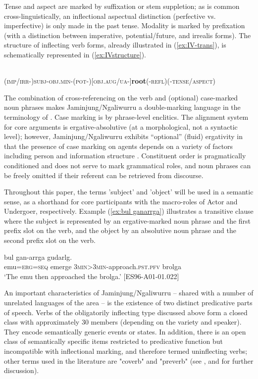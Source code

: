 \documentclass[output=paper,colorlinks,citecolor=brown]{langscibook}
\begin{document}
Tense and aspect are marked by suffixation or stem suppletion; as is common cross-linguistically, an inflectional aspectual distinction (perfective vs. imperfective) is only made in the past tense. Modality is marked by prefixation (with a distinction between imperative, potential/future, and irrealis forms). The structure of inflecting verb forms, already illustrated in (\ref{ex:IV-trans}), is schematically represented in (\ref{ex:IVstructure}). 

\\
\textsc{(imp/irr-)subj-obj.min-(pot-)[obj.aug/ua-]}\textbf{root}\textsc{(-refl)(-tense/aspect)}\\
\label{ex:IVstructure}
\z

The combination of cross-referencing on the verb and (optional) case-marked noun phrases makes Jaminjung/Ngaliwurru a double-marking language in the terminology of \citet{Nichols1986}. Case marking is by phrase-level enclitics. The alignment system for core arguments is ergative-absolutive (at a morphological, not a syntactic level); however, Jaminjung/Ngaliwurru exhibits “optional” (fluid) ergativity in that the presence of case marking on agents depends on a variety of factors including person and information structure \citep{SchultzeBerndt2017,SchultzeBerndtMeakinsinprep}.
Constituent order is pragmatically conditioned and does not serve to mark grammatical roles, and noun phrases can be freely omitted if their referent can be retrieved from discourse.

Throughout this paper, the terms 'subject' and 'object' will be used in a semantic sense, as a shorthand for core participants with the macro-roles of Actor and Undergoer, respectively. Example (\ref{ex:bul ganarrga}) illustrates a transitive clause where the subject is represented by an ergative-marked noun phrase and the first prefix slot on the verb, and the object by an absolutive noun phrase and the second prefix slot on the verb. 

\ea 
{} {bul} {gan-arrga} {gudarlg.}\\
emu\textsc{=erg=seq} emerge \textsc{3min>3min}-approach.\textsc{pst.pfv} brolga\\ 
\glt `The emu then approached the brolga.' [ES96-A01-01.022]
\label{ex:bul ganarrga}
\z

An important characteristics of Jaminjung/Ngaliwurru – shared with a number of unrelated languages of the area – is the existence of two distinct predicative parts of speech. Verbs of the obligatorily inflecting type discussed above form a closed class with approximately 30 members (depending on the variety and speaker). They encode semantically generic events or states. In addition, there is an open class of semantically specific items restricted to predicative function but incompatible with inflectional marking, and therefore termed uninflecting verbs; other terms used in the literature are "coverb" and "preverb" (see \citealt{SchultzeBerndt2003}, \citealt{SchultzeBerndt2017} and \citealt{McGregor2002} for further discussion).
\end{document}
